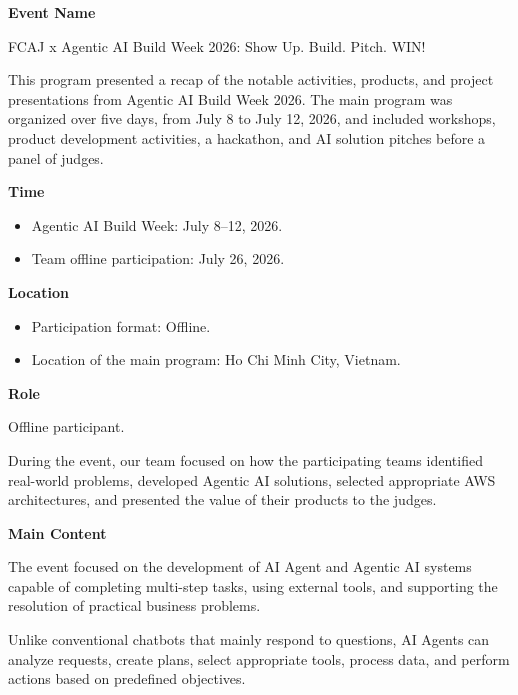 \vspace{0.5em}\noindent\textbf{Event Name}\par

FCAJ x Agentic AI Build Week 2026: Show Up. Build. Pitch. WIN!

This program presented a recap of the notable activities, products, and
project presentations from Agentic AI Build Week 2026. The main program
was organized over five days, from July 8 to July 12, 2026, and included
workshops, product development activities, a hackathon, and AI solution
pitches before a panel of judges.

\vspace{0.5em}\noindent\textbf{Time}\par

\begin{itemize}
\tightlist
\item
  Agentic AI Build Week: July 8--12, 2026.
\item
  Team offline participation: July 26, 2026.
\end{itemize}

\vspace{0.5em}\noindent\textbf{Location}\par

\begin{itemize}
\tightlist
\item
  Participation format: Offline.
\item
  Location of the main program: Ho Chi Minh City, Vietnam.
\end{itemize}

\vspace{0.5em}\noindent\textbf{Role}\par

Offline participant.

During the event, our team focused on how the participating teams
identified real-world problems, developed Agentic AI solutions, selected
appropriate AWS architectures, and presented the value of their products
to the judges.

\vspace{0.5em}\noindent\textbf{Main Content}\par

The event focused on the development of AI Agent and Agentic AI systems
capable of completing multi-step tasks, using external tools, and
supporting the resolution of practical business problems.

Unlike conventional chatbots that mainly respond to questions, AI Agents
can analyze requests, create plans, select appropriate tools, process
data, and perform actions based on predefined objectives.

